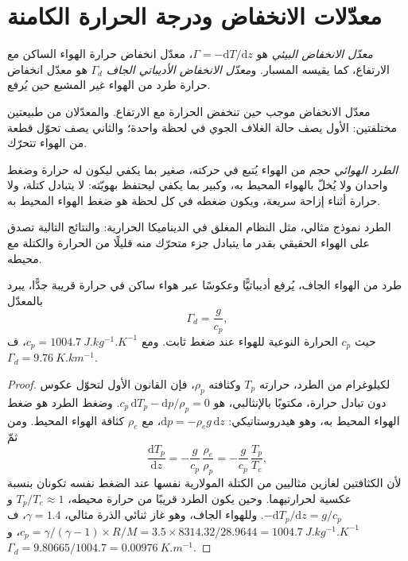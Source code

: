 \section{معدّلات الانخفاض ودرجة الحرارة الكامنة}\label{sec:b1:fluid-envelopes-structure:lapse}

\begin{definition}\label{def:b1:fluid-envelopes-structure:lapse-rate}
\emph{معدّل الانخفاض البيئي} هو $\Gamma =
-\mathrm dT/\mathrm dz$، معدّل انخفاض حرارة الهواء الساكن مع الارتفاع، كما يقيسه المسبار. و\emph{معدّل الانخفاض الأديباتي الجاف} $\Gamma_d$ هو معدّل انخفاض حرارة طرد من الهواء غير المشبع حين يُرفع.
\end{definition}

معدّل الانخفاض موجب حين تنخفض الحرارة مع الارتفاع. والمعدّلان من طبيعتين مختلفتين: الأول يصف حالة الغلاف الجوي في لحظة واحدة؛ والثاني يصف تحوّل قطعة من الهواء تتحرّك.

\begin{definition}\label{def:b1:fluid-envelopes-structure:parcel}
\emph{الطرد الهوائي} حجم من الهواء يُتبع في حركته، صغير بما يكفي ليكون له حرارة وضغط واحدان ولا يُخلّ بالهواء المحيط به، وكبير بما يكفي ليحتفظ بهويّته: لا يتبادل كتلة، ولا حرارة أثناء إزاحة سريعة، ويكون ضغطه في كل لحظة هو ضغط الهواء المحيط به.
\end{definition}

الطرد نموذج مثالي، مثل النظام المغلق في الديناميكا الحرارية: والنتائج التالية تصدق على الهواء الحقيقي بقدر ما يتبادل جزء متحرّك منه قليلًا من الحرارة والكتلة مع محيطه.

\begin{theorem}\label{thm:b1:fluid-envelopes-structure:dry-adiabatic}
طرد من الهواء الجاف، يُرفع أديباتيًّا وعكوسًا عبر هواء ساكن في حرارة قريبة جدًّا، يبرد بالمعدّل
\[
  \Gamma_d = \frac{g}{c_p},
\]
حيث $c_p$ الحرارة النوعية للهواء عند ضغط ثابت. ومع $c_p =
\qty{1004.7}{J.kg^{-1}.K^{-1}}$، ف$\Gamma_d = \qty{9.76}{K.km^{-1}}$.
\end{theorem}

\begin{proof}
لكيلوغرام من الطرد، حرارته $T_p$ وكثافته $\rho_p$، فإن القانون الأول لتحوّل عكوس دون تبادل حرارة، مكتوبًا بالإنثالبي، هو $c_p\,\mathrm dT_p - \mathrm dp/\rho_p = 0$. وضغط الطرد هو ضغط الهواء المحيط به، وهو هيدروستاتيكي: $\mathrm dp = -\rho_e
g\,\mathrm dz$، مع $\rho_e$ كثافة الهواء المحيط. ومن ثمّ
\[
  \frac{\mathrm dT_p}{\mathrm dz} = -\frac{g}{c_p}\,\frac{\rho_e}{\rho_p}
  = -\frac{g}{c_p}\,\frac{T_p}{T_e},
\]
لأن الكثافتين لغازين مثاليين من الكتلة المولارية نفسها عند الضغط نفسه تكونان بنسبة عكسية لحرارتيهما. وحين يكون الطرد قريبًا من حرارة محيطه، $T_p/T_e \approx 1$ و$-\mathrm dT_p/\mathrm dz
= g/c_p$. وللهواء الجاف، وهو غاز ثنائي الذرة مثالي، $\gamma = 1.4$، ف$c_p =
\gamma/(\gamma - 1) \times R/M = 3.5 \times 8314.32/28.9644 =
\qty{1004.7}{J.kg^{-1}.K^{-1}}$، و$\Gamma_d = 9.80665/1004.7 =
\qty{0.00976}{K.m^{-1}}$.
\end{proof}

